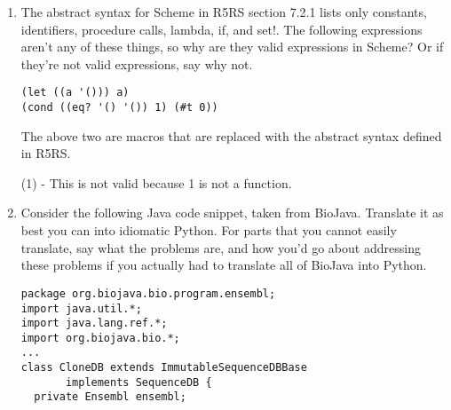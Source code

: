 \documentclass[10pt]{article}
\begin{document}
\begin{enumerate}
        In the first case (left-to-right), the first `car' would be evaluated to the `car' function, and then the `car' identifier
        would be set to the `cdr' function. Then, the list of the `car' identifier (looked up to be `cdr') and the `cdr' function
        would be created. The `car' from the beginning would access the first element, which is the `cdr' function (from the `car' identifier).

        In the second case (right-to-left), the (list...) subexpression would get evaluated first, created a list of the `car'
        function and the `cdr' function. Then the `car' identifier would get bound to the `cdr' function, and finally
        the leftmost `car' identifier would be looked up to be the `cdr' function. So (cdr (car cdr)) would evaluate to the `cdr' function.

        Note, however, that it is not even guaranteed that if an expression is evaluated left-to-right, its subexpressions will also be evaluated
        left-to-right. Directionality may change in subexpressions, so you may get some combination of the above behavior.

        \item The abstract syntax for Scheme in R5RS section 7.2.1 lists only constants, identifiers, procedure calls, lambda, if, and
        set!. The following expressions aren't any of these things, so why are they valid expressions in Scheme? Or if they're not valid
        expressions, say why not.

\begin{verbatim}
(let ((a '())) a)
(cond ((eq? '() '()) 1) (#t 0))
\end{verbatim}

        The above two are macros that are replaced with the abstract syntax defined in R5RS.

        (1) - This is not valid because 1 is not a function.

        \item Consider the following Java code snippet, taken from BioJava. Translate it as best you can into idiomatic Python. For parts
        that you cannot easily translate, say what the problems are, and how you'd go about addressing these problems if you actually had
        to translate all of BioJava into Python.

\begin{multicols}{2}
\scriptsize
\begin{verbatim}
package org.biojava.bio.program.ensembl;
import java.util.*;
import java.lang.ref.*;
import org.biojava.bio.*;
...
class CloneDB extends ImmutableSequenceDBBase
       implements SequenceDB {
  private Ensembl ensembl;


\end{verbatim}
\end{multicols}
\end{enumerate}
\end{document}
